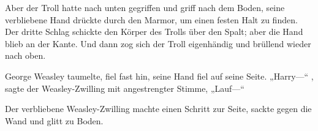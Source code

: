 Aber der Troll hatte nach unten gegriffen und griff nach dem Boden, seine verbliebene Hand drückte durch den Marmor, um einen festen Halt zu finden. Der dritte Schlag schickte den Körper des Trolls über den Spalt; aber die Hand blieb an der Kante. Und dann zog sich der Troll eigenhändig und brüllend wieder nach oben.

George Weasley taumelte, fiel fast hin, seine Hand fiel auf seine Seite. „Harry—“ , sagte der Weasley-Zwilling mit angestrengter Stimme, „Lauf—“

Der verbliebene Weasley-Zwilling machte einen Schritt zur Seite, sackte gegen die Wand und glitt zu Boden.

